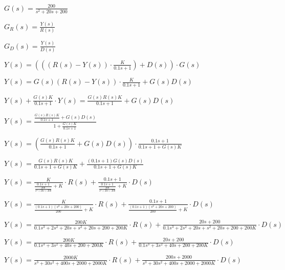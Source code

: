 \documentclass[12pt]{article}
\begin{document}
$G\left(s\right) = \frac{200}{s^2 + 20s + 200}$

$G_R\left(s\right) = \frac{Y\left(s\right)}{R\left(s\right)}$

$G_D\left(s\right) = \frac{Y\left(s\right)}{D\left(s\right)}$

$Y\left(s\right) = \left(\left(\left(R\left(s\right) - Y\left(s\right)\right) \cdot \frac{K}{0.1s + 1}\right) + D\left(s\right)\right) \cdot G\left(s\right)$

$Y\left(s\right) = G\left(s\right)\left(R\left(s\right) - Y\left(s\right)\right) \cdot \frac{K}{0.1s + 1} + G\left(s\right)D\left(s\right)$

$Y\left(s\right) + \frac{G\left(s\right)K}{0.1s + 1} \cdot Y\left(s\right) = \frac{G\left(s\right)R\left(s\right)K}{0.1s + 1} + G\left(s\right)D\left(s\right)$

$Y\left(s\right) = \frac{\frac{G\left(s\right)R\left(s\right)K}{0.1s + 1} + G\left(s\right)D\left(s\right)}{1 + \frac{G\left(s\right)K}{0.1s + 1}}$

$Y\left(s\right) = \left(\frac{G\left(s\right)R\left(s\right)K}{0.1s + 1} + G\left(s\right)D\left(s\right)\right) \cdot \frac{0.1s + 1}{0.1s + 1 + G\left(s\right)K}$

$Y\left(s\right) = \frac{G\left(s\right)R\left(s\right)K}{0.1s + 1 + G\left(s\right)K} + \frac{\left(0.1s + 1\right)G\left(s\right)D\left(s\right)}{0.1s + 1 + G\left(s\right)K}$

$Y\left(s\right) = \frac{K}{\frac{0.1s + 1}{\frac{200}{s^2 + 20s + 200}} + K} \cdot R\left(s\right) + \frac{0.1s + 1}{\frac{0.1s + 1}{\frac{200}{s^2 + 20s + 200}} + K} \cdot D\left(s\right)$

$Y\left(s\right) = \frac{K}{\frac{\left(0.1s + 1\right)\left(s^2 + 20s + 200\right)}{200} + K} \cdot R\left(s\right) + \frac{0.1s + 1}{\frac{\left(0.1s + 1\right)\left(s^2 + 20s + 200\right)}{200} + K} \cdot D\left(s\right)$

$Y\left(s\right) = \frac{200K}{0.1s^3 + 2s^2 + 20s + s^2 + 20s + 200 + 200K} \cdot R\left(s\right) + \frac{20s + 200}{0.1s^3 + 2s^2 + 20s + s^2 + 20s + 200 + 200K} \cdot D\left(s\right)$

$Y\left(s\right) = \frac{200K}{0.1s^3 + 3s^2 + 40s + 200 + 200K} \cdot R\left(s\right) + \frac{20s + 200}{0.1s^3 + 3s^2 + 40s + 200 + 200K} \cdot D\left(s\right)$

$Y\left(s\right) = \frac{2000K}{s^3 + 30s^2 + 400s + 2000 + 2000K} \cdot R\left(s\right) + \frac{200s + 2000}{s^3 + 30s^2 + 400s + 2000 + 2000K} \cdot D\left(s\right)$
\end{document}
